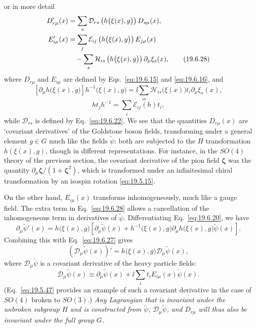 or in more detail
\begin{align}
D'_{r\mu}(x)
&=\sum_s\mathcal D_{rs}
\left(h\bigl(\xi(x),g\bigr)\right)D_{s\mu}(x),
\notag\\
E'_{i\mu}(x)
&=\sum_j\mathcal E_{ij}
\left(h\bigl(\xi(x),g\bigr)\right)E_{j\mu}(x)
\notag\\
&\quad-\sum_s\mathcal H_{is}
\left(h\bigl(\xi(x),g\bigr)\right)\partial_\mu\xi_s(x),
\tag{19.6.28}\label{eq:19.6.28}
\end{align}
where $D_{r\mu}$ and $E_{i\mu}$ are defined by Eqs.~\eqref{eq:19.6.15} and \eqref{eq:19.6.16}, and
\[
\left[\partial_\mu h\bigl(\xi(x),g\bigr)\right]
h^{-1}\bigl(\xi(x),g\bigr)
=\ii\sum_{is}\mathcal H_{is}\bigl(\xi(x)\bigr)
t_i\partial_\mu\xi_s(x),
\]
\[
ht_jh^{-1}=\sum_i\mathcal E_{ij}(h)t_i,
\]
while $\mathcal D_{rs}$ is defined by Eq.~\eqref{eq:19.6.22}. We see that the quantities $D_{r\mu}(x)$ are `covariant derivatives' of the Goldstone boson fields, transforming under a general element $g\in G$ much like the fields $\widetilde\psi$: both are subjected to the $H$ transformation $h(\xi(x),g)$, though in different representations. For instance, in the $SO(4)$ theory of the previous section, the covariant derivative of the pion field $\boldsymbol\zeta$ was the quantity $\partial_\mu\boldsymbol\zeta/(1+\boldsymbol\zeta^2)$, which is transformed under an infinitesimal chiral transformation by an isospin rotation \eqref{eq:19.5.15}.

On the other hand, $E_{i\mu}(x)$ transforms inhomogeneously, much like a gauge field. The extra term in Eq.~\eqref{eq:19.6.28} allows a cancellation of the inhomogeneous term in derivatives of $\widetilde\psi$. Differentiating Eq.~\eqref{eq:19.6.20}, we have
\[
\partial_\mu\widetilde\psi'(x)
=h\bigl(\xi(x),g\bigr)\left[
\partial_\mu\widetilde\psi(x)
+h^{-1}\bigl(\xi(x),g\bigr)
\partial_\mu h\bigl(\xi(x),g\bigr)\widetilde\psi(x)
\right].
\]
Combining this with Eq.~\eqref{eq:19.6.27} gives
\begin{equation}
\left(\mathcal D_\mu\widetilde\psi(x)\right)'
=h\bigl(\xi(x),g\bigr)\mathcal D_\mu\widetilde\psi(x),
\tag{19.6.29}\label{eq:19.6.29}
\end{equation}
where $\mathcal D_\mu\widetilde\psi$ is a covariant derivative of the heavy particle fields:
\begin{equation}
\mathcal D_\mu\widetilde\psi(x)
\equiv\partial_\mu\widetilde\psi(x)
+\ii\sum_i t_iE_{i\mu}(x)\widetilde\psi(x).
\tag{19.6.30}\label{eq:19.6.30}
\end{equation}
(Eq.~\eqref{eq:19.5.47} provides an example of such a covariant derivative in the case of $SO(4)$ broken to $SO(3)$.) \emph{Any Lagrangian that is invariant under the unbroken subgroup $H$ and is constructed from $\widetilde\psi$, $\mathcal D_\mu\widetilde\psi$, and $D_{r\mu}$ will thus also be invariant under the full group $G$.}

